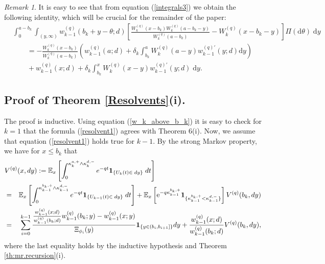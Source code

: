 \documentclass[12pt,reqno]{amsart}
\newcommand{\blue}{\textcolor[rgb]{0.00,0.00,1.00}}
\theoremstyle{definition}
\theoremstyle{remark}
\newtheorem{remark}[theorem]{Remark}
\newcommand{\e}{\mathbb{E}}
\newcommand{\ind}{\mathbf{1}}
\newcommand{\md}{\mathrm{d}}
\newcommand{\wq}{w^{(q)}}
\begin{document}
\begin{remark}\label{useful_identity}
It is easy to see that from equation (\ref{integrals3}) we obtain the following identity, which will be crucial for the remainder of the paper:
\begin{align}\label{integrals4}\nonumber
 &\int_{0}^{a-b_k}\int_{(y,\infty)} \wq_{k-1}(b_k+y-\theta;d)\left[\frac{W_k^{(q)}(x-b_k)W_k^{(q)}(a-b_k-y)}{W_k^{(q)}(a-b_k)}-W_k^{(q)}(x-b_k-y)\right] 
\Pi(\textrm{d}\theta)\;\textrm{d}y \\\nonumber & \qquad=
 -\frac{W_k^{(q)}(x-b_k)}{W_k^{(q)}(a-b_k)}\left(\wq_{k-1}(a;d)+\delta_k \int^{a}_{b_{k}}W_k^{\left(q\right)}(a-y)w_{k-1}^{\left(q\right)'}(y;d)\md y\right)\\ & \qquad+
\wq_{k-1}(x;d)+\delta_k \int^{x}_{b_{k}}W_k^{\left(q\right)}(x-y)w_{k-1}^{\left(q\right)'}(y;d)\;\md y.
\end{align}

\end{remark}

\subsection{Proof of Theorem \ref{Resolvents}(i).} 
The proof is inductive. Using equation (\ref{w_k_above_b_k}) it is easy to check for $k=1$ that the formula (\ref{resolvent1}) 
agrees with \cite{kyprianouloeffen2010} {Theorem 6(i)}. Now, we assume that equation (\ref{resolvent1}) 
holds true for $k-1$. By the strong Markov property, we have for $x\leq b_k$ that
\begin{eqnarray}\label{resolvent_under_b_k}\nonumber
\lefteqn{V^{(q)}(x, dy):=\e_x\left[\int_0^{\kappa_k^{a,+}\wedge \kappa_k^{d,-}}e^{-qt}\ind_{\{U_k(t)\in \;dy\}}\;dt\right]}\\\nonumber &=&
\e_x\left[\int_0^{\kappa_{k-1}^{b_k,+}\wedge \kappa_{k-1}^{d,-}} e^{-qt}\ind_{\{U_{k-1}(t)\in \;dy\}}\;dt\right]+ 
\e_x \left[ \mathrm{e}^{-q \kappa_{k-1}^{b_k,+}} \ind_{\{\kappa_{k-1}^{b_k,+}< \kappa_{k-1}^{d,-}\}} \right]V^{(q)}(b_k, dy) \\\nonumber &=&
 \sum_{i=0}^{k-1} \frac{\frac{w_{k-1}^{(q)}(x;d)}{w_{k-1}^{(q)}(b_k;d)}w_{k-1}^{(q)}(b_k;y)-w_{k-1}^{(q)}(x;y)}
{\Xi_{\phi_i}(y)}\ind_{\{y\in (b_i,b_{i+1}]\}}dy+ \frac{w_{k-1}^{(q)}(x;d)}{w^{(q)}_{k-1}(b_k;d)}V^{(q)}(b_k, dy),\\
\end{eqnarray}
where the last equality holds by the inductive hypothesis and Theorem \ref{th:mr.recursion}(i).
 
\end{document}

